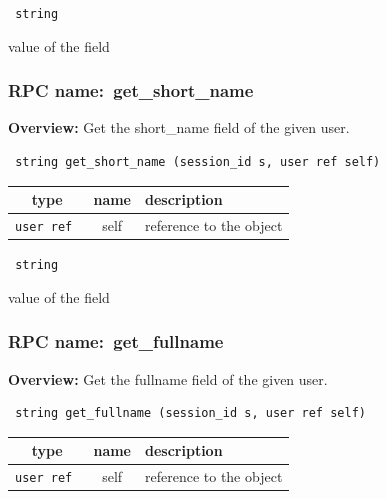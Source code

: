 \vspace{0.3cm}

{\tt 
string
}


value of the field
\vspace{0.3cm}
\vspace{0.3cm}
\vspace{0.3cm}
\subsubsection{RPC name:~get\_short\_name}

{\bf Overview:} 
Get the short\_name field of the given user.

\begin{verbatim} string get_short_name (session_id s, user ref self)\end{verbatim}



 
\vspace{0.3cm}
\begin{tabular}{|c|c|p{7cm}|}
 \hline
{\bf type} & {\bf name} & {\bf description} \\ \hline
{\tt user ref } & self & reference to the object \\ \hline 

\end{tabular}

\vspace{0.3cm}

{\tt 
string
}


value of the field
\vspace{0.3cm}
\vspace{0.3cm}
\vspace{0.3cm}
\subsubsection{RPC name:~get\_fullname}

{\bf Overview:} 
Get the fullname field of the given user.

\begin{verbatim} string get_fullname (session_id s, user ref self)\end{verbatim}



 
\vspace{0.3cm}
\begin{tabular}{|c|c|p{7cm}|}
 \hline
{\bf type} & {\bf name} & {\bf description} \\ \hline
{\tt user ref } & self & reference to the object \\ \hline 

\end{tabular}

